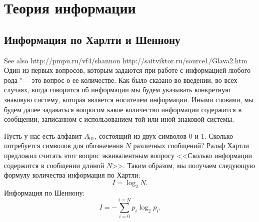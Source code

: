 \documentclass[b5paper,11pt]{book}
\begin{document}
	
	\chapter{Теория информации}
	
	\section{Информация по Харлти и Шеннону}
	See also http://pmpu.ru/vf4/shannon
http://saitviktor.ru/source1/Glava2.htm
	Один из первых вопросов, которым задаются при работе с информацией любого рода "--- это вопрос о ее количестве. Как было сказано во введении, во всех случаях, когда говорится об информации мы будем указывать конкретную знаковую систему, которая является носителем информации. Иными словами, мы будем далее задаваться вопросом какое количество информации содержится в сообщении, записанном с использованием той или иной знаковой системы.
	
	Пусть у нас есть алфавит $A_{01}$, состоящий из двух символов 0 и 1. Сколько потребуется символов для обозначения $N$ различных сообщений? Ральф Хартли предложил считать этот вопрос эквивалентным вопросу <<Сколько информации содержится в сообщении длиной $N$>>. Таким образом, мы получаем следующую формулу количества информация по Хартли:
	\begin{equation}
		I = \log_2N.
	\end{equation}
	Информация по Шеннону:
	\begin{equation}
		I = -\sum_{i=0}^{i=N} p_i\log_2p_i.
	\end{equation}
\end{document}
